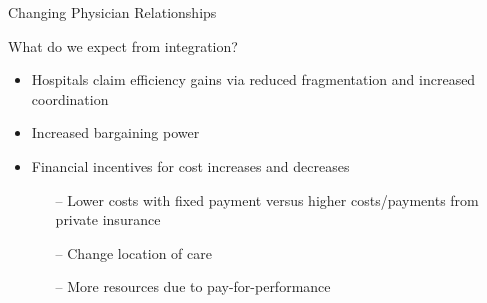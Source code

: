 \documentclass[t,aspectratio=169]{beamer}
\begin{document}
\begin{frame}{Changing Physician Relationships}
\end{frame}

\begin{frame}{What do we expect from integration?}
    \begin{itemize}
        \item Hospitals claim efficiency gains via reduced fragmentation and increased coordination
        \item Increased bargaining power
        \item Financial incentives for cost increases and decreases
        \begin{itemize}
            \item[--] Lower costs with fixed payment versus higher costs/payments from private insurance
            \item[--] Change location of care
            \item[--] More resources due to pay-for-performance
        \end{itemize}
    \end{itemize}
\end{frame}
\end{document}
